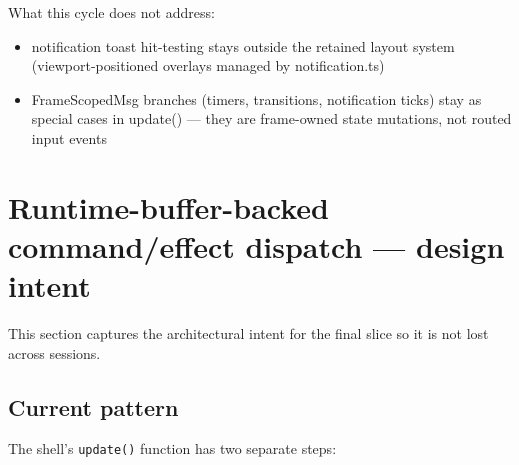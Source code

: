 What this cycle does not address:

\begin{itemize}
\tightlist
\item
  notification toast hit-testing stays outside the retained layout system (viewport-positioned overlays managed by notification.ts)
\item
  FrameScopedMsg branches (timers, transitions, notification ticks) stay as special cases in update() --- they are frame-owned state mutations, not routed input events
\end{itemize}

\section{Runtime-buffer-backed command/effect dispatch --- design intent}\label{record-155-runtime-buffer-backed-commandeffect-dispatch-design-intent}

This section captures the architectural intent for the final slice so it is not lost across sessions.

\subsection{Current pattern}\label{record-155-current-pattern}

The shell's \texttt{u\allowbreak{}p\allowbreak{}d\allowbreak{}a\allowbreak{}t\allowbreak{}e\allowbreak{}(\allowbreak{})} function has two separate steps:

